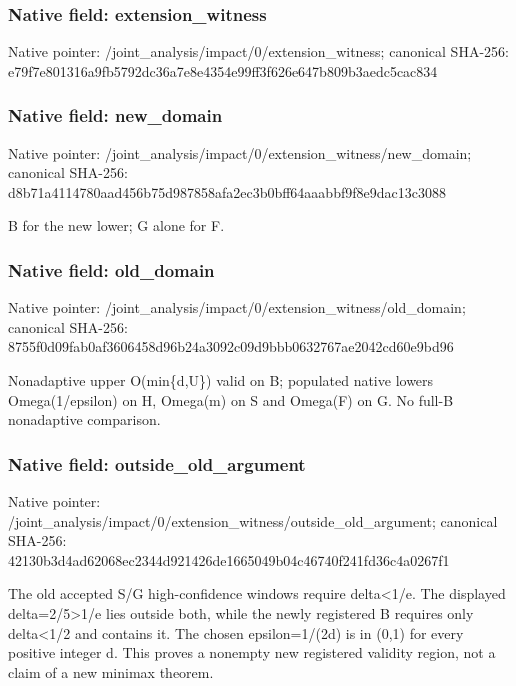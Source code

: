 \documentclass[10pt,a4paper]{article}
\begin{document}
\subsubsection{Native field: extension\_\allowbreak{}witness}
Native pointer: /joint\_\allowbreak{}analysis/impact/0/extension\_\allowbreak{}witness; canonical SHA-256: e79f7e801316a9fb5792dc36a7e8e4354e99ff3f626e647b809b3aedc5cac834

\subsubsection{Native field: new\_\allowbreak{}domain}
Native pointer: /joint\_\allowbreak{}analysis/impact/0/extension\_\allowbreak{}witness/new\_\allowbreak{}domain; canonical SHA-256: d8b71a4114780aad456b75d987858afa2ec3b0bff64aaabbf9f8e9dac13c3088

\begingroup\raggedright\sloppy B for the new lower;\allowbreak{} G alone for F.\par\endgroup

\subsubsection{Native field: old\_\allowbreak{}domain}
Native pointer: /joint\_\allowbreak{}analysis/impact/0/extension\_\allowbreak{}witness/old\_\allowbreak{}domain; canonical SHA-256: 8755f0d09fab0af3606458d96b24a3092c09d9bbb0632767ae2042cd60e9bd96

\begingroup\raggedright\sloppy Nonadaptive upper O(min\{d,\allowbreak{}U\}) valid on B;\allowbreak{} populated native lowers Omega(1/\allowbreak{}epsilon) on H,\allowbreak{} Omega(m) on S and Omega(F) on G. No full-B nonadaptive comparison.\par\endgroup

\subsubsection{Native field: outside\_\allowbreak{}old\_\allowbreak{}argument}
Native pointer: /joint\_\allowbreak{}analysis/impact/0/extension\_\allowbreak{}witness/outside\_\allowbreak{}old\_\allowbreak{}argument; canonical SHA-256: 42130b3d4ad62068ec2344d921426de1665049b04c46740f241fd36c4a0267f1

\begingroup\raggedright\sloppy The old accepted S/\allowbreak{}G high-confidence windows require delta<1/\allowbreak{}e. The displayed delta=\allowbreak{}2/\allowbreak{}5>1/\allowbreak{}e lies outside both,\allowbreak{} while the newly registered B requires only delta<1/\allowbreak{}2 and contains it. The chosen epsilon=\allowbreak{}1/\allowbreak{}(2d) is in (0,\allowbreak{}1) for every positive integer d. This proves a nonempty new registered validity region,\allowbreak{} not a claim of a new minimax theorem.\par\endgroup
\end{document}

